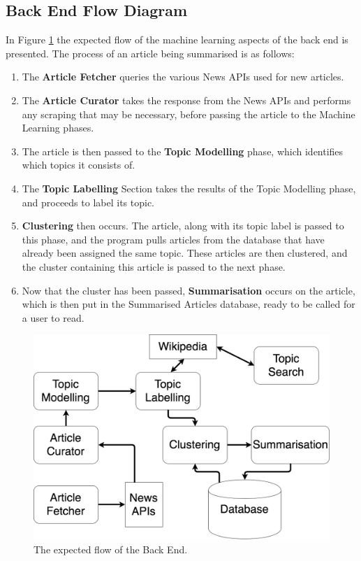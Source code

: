 \documentclass[12pt]{article}
\begin{document}
\subsection{Back End Flow Diagram}

In Figure \ref{backEndArchitecture} the expected flow of the machine learning aspects of the back end is presented. The process of an article being summarised is as follows:

\begin{enumerate}
	\item The \textbf{Article Fetcher} queries the various News APIs used for new articles. 
	\item The \textbf{Article Curator} takes the response from the News APIs and performs any scraping that may be necessary, before passing the article to the Machine Learning phases. 
	\item The article is then passed to the \textbf{Topic Modelling} phase, which identifies which topics it consists of. 
	\item The \textbf{Topic Labelling} Section takes the results of the Topic Modelling phase, and proceeds to label its topic. 
	\item \textbf{Clustering} then occurs. The article, along with its topic label is passed to this phase, and the program pulls articles from the database that have already been assigned the same topic. These articles are then clustered, and the cluster containing this article is passed to the next phase. 
	\item Now that the cluster has been passed, \textbf{Summarisation} occurs on the article, which is then put in the Summarised Articles database, ready to be called for a user to read. 
\end{enumerate}

\begin{figure}[ht!]
  \centering
    \includegraphics[scale=0.4]{BackEndArchitecture.png}
   \caption[A guide to the expected flow of the Back End]{The expected flow of the Back End.}
   \label{backEndArchitecture}
\end{figure}
\end{document}
